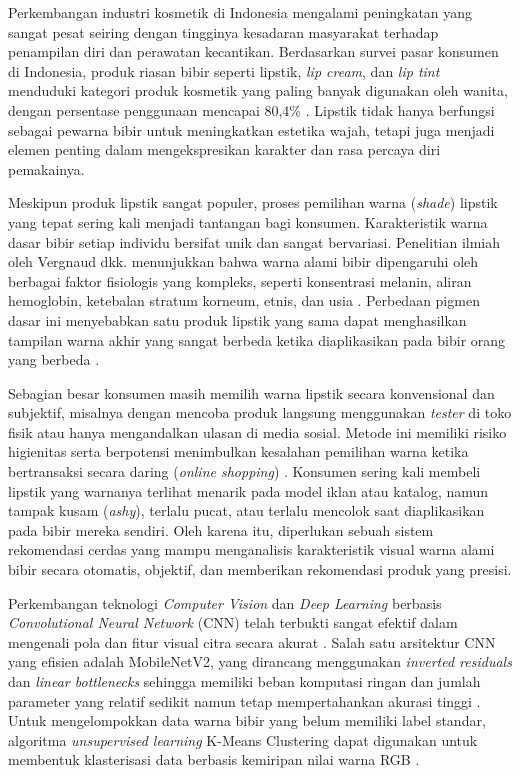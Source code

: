 \documentclass[10pt,a4paper]{article}
\begin{document}
Perkembangan industri kosmetik di Indonesia mengalami peningkatan yang sangat pesat seiring dengan tingginya kesadaran masyarakat terhadap penampilan diri dan perawatan kecantikan. Berdasarkan survei pasar konsumen di Indonesia, produk riasan bibir seperti lipstik, \textit{lip cream}, dan \textit{lip tint} menduduki kategori produk kosmetik yang paling banyak digunakan oleh wanita, dengan persentase penggunaan mencapai 80,4\% \cite{jakpat2025}. Lipstik tidak hanya berfungsi sebagai pewarna bibir untuk meningkatkan estetika wajah, tetapi juga menjadi elemen penting dalam mengekspresikan karakter dan rasa percaya diri pemakainya.

Meskipun produk lipstik sangat populer, proses pemilihan warna (\textit{shade}) lipstik yang tepat sering kali menjadi tantangan bagi konsumen. Karakteristik warna dasar bibir setiap individu bersifat unik dan sangat bervariasi. Penelitian ilmiah oleh Vergnaud dkk. menunjukkan bahwa warna alami bibir dipengaruhi oleh berbagai faktor fisiologis yang kompleks, seperti konsentrasi melanin, aliran hemoglobin, ketebalan stratum korneum, etnis, dan usia \cite{vergnaud2024lip, vergnaud2023measurement}. Perbedaan pigmen dasar ini menyebabkan satu produk lipstik yang sama dapat menghasilkan tampilan warna akhir yang sangat berbeda ketika diaplikasikan pada bibir orang yang berbeda \cite{charton2026development}.

Sebagian besar konsumen masih memilih warna lipstik secara konvensional dan subjektif, misalnya dengan mencoba produk langsung menggunakan \textit{tester} di toko fisik atau hanya mengandalkan ulasan di media sosial. Metode ini memiliki risiko higienitas serta berpotensi menimbulkan kesalahan pemilihan warna ketika bertransaksi secara daring (\textit{online shopping}) \cite{katariya2025novel}. Konsumen sering kali membeli lipstik yang warnanya terlihat menarik pada model iklan atau katalog, namun tampak kusam (\textit{ashy}), terlalu pucat, atau terlalu mencolok saat diaplikasikan pada bibir mereka sendiri. Oleh karena itu, diperlukan sebuah sistem rekomendasi cerdas yang mampu menganalisis karakteristik visual warna alami bibir secara otomatis, objektif, dan memberikan rekomendasi produk yang presisi.

Perkembangan teknologi \textit{Computer Vision} dan \textit{Deep Learning} berbasis \textit{Convolutional Neural Network} (CNN) telah terbukti sangat efektif dalam mengenali pola dan fitur visual citra secara akurat \cite{szeliski2022computer, goodfellow2016deep, lecun2015deep}. Salah satu arsitektur CNN yang efisien adalah MobileNetV2, yang dirancang menggunakan \textit{inverted residuals} dan \textit{linear bottlenecks} sehingga memiliki beban komputasi ringan dan jumlah parameter yang relatif sedikit namun tetap mempertahankan akurasi tinggi \cite{sandler2018mobilenetv2, howard2017mobilenets}. Untuk mengelompokkan data warna bibir yang belum memiliki label standar, algoritma \textit{unsupervised learning} K-Means Clustering dapat digunakan untuk membentuk klasterisasi data berbasis kemiripan nilai warna RGB \cite{macqueen1967methods, pedregosa2011scikit}.
\end{document}
